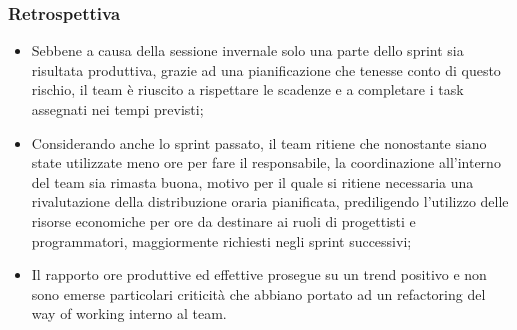 \documentclass[10pt, a4paper]{article}
\begin{document}
\subsubsection{Retrospettiva}
\begin{itemize}
    \item Sebbene a causa della sessione invernale solo una parte dello sprint sia risultata produttiva, grazie
    ad una pianificazione che tenesse conto di questo rischio, il team è riuscito a rispettare le scadenze e a 
    completare i task assegnati nei tempi previsti;
    \item Considerando anche lo sprint passato, il team ritiene che nonostante siano state utilizzate meno ore per fare il responsabile,
    la coordinazione all'interno del team sia rimasta buona, motivo per il quale si ritiene necessaria una rivalutazione della distribuzione oraria pianificata, 
    prediligendo l'utilizzo delle risorse economiche per ore da destinare ai ruoli di progettisti e programmatori, maggiormente richiesti negli sprint successivi;
    \item Il rapporto ore produttive ed effettive prosegue su un trend positivo e non sono emerse particolari criticità
    che abbiano portato ad un refactoring del way of working interno al team.
\end{itemize}
\end{document}
